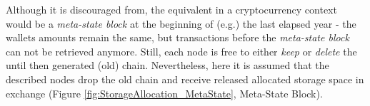 \noindent Although it is discouraged from, the equivalent in a cryptocurrency context would be
a \textit{meta-state block} at the beginning of (e.g.) the last elapsed
year - the wallets amounts remain the same, but transactions before
the \textit{meta-state block} can not be retrieved anymore.
Still, each node is free to either \textit{keep} or \textit{delete} the until then generated (old) chain.
Nevertheless, here it is assumed that the described nodes drop the old chain and receive
released allocated storage space in exchange (Figure \ref{fig:StorageAllocation_MetaState}, Meta-State Block).
\begin{figure}[!b]
\end{figure}

